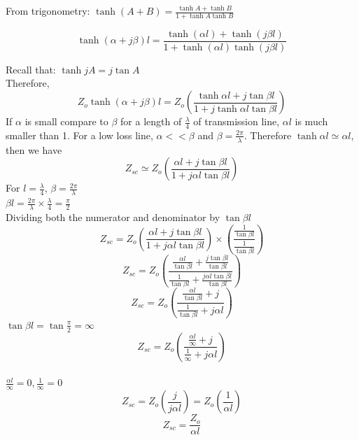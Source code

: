 From trigonometry:
$\tanh(A+B)=\frac{\tanh A+\tanh B}{1+\tanh A\tanh B} $

\begin{equation}
\tanh(\alpha+j\beta)l=\frac{\tanh (\alpha l) + \tanh (j\beta l)}{1 + \tanh (\alpha l)\tanh (j\beta l)}
\end{equation}

Recall that: $ \tanh jA= j\tan A $\\
Therefore,
\begin{equation}
Z_{o}\tanh(\alpha+j\beta)l=Z_{o}\left(\frac{\tanh \alpha l+j\tan \beta l}{1+j\tanh \alpha l\tan \beta l}\right)
\end{equation}
If $ \alpha $ is small compare to $ \beta $ for a length of $ \frac{\lambda}{4} $ of transmission line, $ \alpha l $ is much smaller than 1. For a low loss line, $ \alpha<<\beta $ and $ \beta=\frac{2\pi}{\lambda} $. Therefore	$ \tanh \alpha l \simeq \alpha l $, then we have
\begin{equation}
Z_{sc}\simeq Z_{o}\left(\frac{\alpha l + j \tan \beta l}{1+ j\alpha l \tan\beta l}\right)
\end{equation} 
For $ l=\frac{\lambda}{4} $, $ \beta=\frac{2\pi}{\lambda} $\\
$ \beta l= \frac{2\pi}{\lambda} \times\frac{\lambda}{4} =\frac{\pi}{2} $\\
Dividing both the numerator and denominator by $ \tan\beta l $
\begin{equation}
Z_{sc}=Z_{o}\left(\frac{\alpha l + j \tan \beta l}{1+ j\alpha l \tan\beta l}\right)\times\left(\frac{\frac{1}{\tan \beta l}}{\frac{1}{\tan \beta l}}\right)
\end{equation}
\begin{equation}
Z_{sc}=Z_{o}\left(\frac{\frac{\alpha l}{\tan \beta l}+\frac{j\tan \beta l}{\tan \beta l}}{\frac{1}{\tan \beta l}+\frac{j\alpha l\tan \beta l}{\tan \beta l}}\right)
\end{equation}
\begin{equation}
Z_{sc}=Z_{o}\left(\frac{\frac{\alpha l}{\tan \beta l} + j}{\frac{1}{\tan \beta l} + j\alpha l}\right)
\end{equation}
$ \tan \beta l =\tan\frac{\pi}{2}=\infty $
\begin{equation}
Z_{sc}=Z_{o}\left(\frac{\frac{\alpha l}{\infty} + j}{\frac{1}{\infty} + j \alpha l}\right)
\end{equation}\\
$ \frac{\alpha l}{\infty}=0, \frac{1}{\infty}=0  $
\begin{equation}
Z_{sc}=Z_{o}\left(\frac{j}{j\alpha l}\right)=Z_{o}\left(\frac{1}{\alpha l}\right)
\end{equation}
\begin{equation}
\boxed{Z_{sc}=\frac{Z_{o}}{\alpha l}}	\end{equation}

